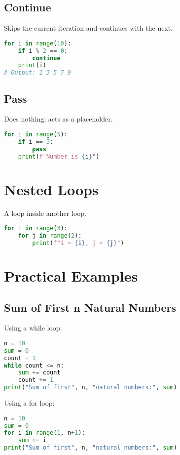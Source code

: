 \subsection{Continue}

Skips the current iteration and continues with the next.

\begin{lstlisting}[language=Python]
for i in range(10):
    if i % 2 == 0:
        continue
    print(i)
# Output: 1 3 5 7 9
\end{lstlisting}

\subsection{Pass}

Does nothing; acts as a placeholder.

\begin{lstlisting}[language=Python]
for i in range(5):
    if i == 3:
        pass
    print(f"Number is {i}")
\end{lstlisting}

\section{Nested Loops}

A loop inside another loop.

\begin{lstlisting}[language=Python]
for i in range(3):
    for j in range(2):
        print(f"i = {i}, j = {j}")
\end{lstlisting}

\section{Practical Examples}

\subsection{Sum of First n Natural Numbers}

Using a while loop:
\begin{lstlisting}[language=Python]
n = 10
sum = 0
count = 1
while count <= n:
    sum += count
    count += 1
print("Sum of first", n, "natural numbers:", sum)
\end{lstlisting}

Using a for loop:
\begin{lstlisting}[language=Python]
n = 10
sum = 0
for i in range(1, n+1):
    sum += i
print("Sum of first", n, "natural numbers:", sum)
\end{lstlisting}

